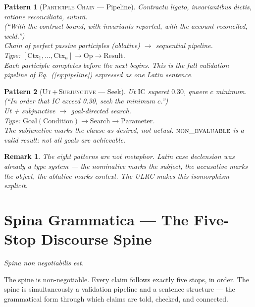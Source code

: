\documentclass[
  aps,
  prd,
  twocolumn,
  superscriptaddress,
  nofootinbib,
  floatfix
]{revtex4-2}
\newtheorem{remark}{Remark}
\newtheorem{pattern}{Pattern}
\newcommand{\regime}[1]{\textrm{\upshape\scshape#1}}
\newcommand{\IC}{\mathrm{IC}}
\newcommand{\lat}[1]{\textit{#1}}
\begin{document}
\begin{pattern}[\textsc{Participle Chain} ---
  Pipeline]\label{pat:participle}
\lat{Contractu ligato, invariantibus dictis,
  ratione reconciliat\=a, sutur\=a.}\\
(``With the contract bound, with invariants reported, with the
account reconciled, weld.'')\\
Chain of perfect passive participles (ablative) $\to$ sequential
pipeline.\\
Type: $[\mathrm{Ctx}_1, \ldots, \mathrm{Ctx}_n]
  \to \mathrm{Op} \to \mathrm{Result}$.\\
Each participle completes before the next begins. This
\emph{is} the full validation pipeline of Eq.~(\ref{eq:pipeline})
expressed as one Latin sentence.
\end{pattern}

\begin{pattern}[\textsc{Ut\,+\,Subjunctive} ---
  Seek]\label{pat:ut-subj}
\lat{Ut $\IC$ superet $0.30$, quaere $c$ minimum.}
(``In order that IC exceed 0.30, seek the minimum $c$.'')\\
\lat{Ut} + subjunctive $\to$ goal-directed search.\\
Type: $\mathrm{Goal}(\mathrm{Condition}) \to \mathrm{Search}
  \to \mathrm{Parameter}$.\\
The subjunctive marks the clause as desired, not actual.
$\regime{non\_evaluable}$ is a valid result: not all goals are
achievable.
\end{pattern}

\begin{remark}
The eight patterns are not metaphor. Latin case declension
\emph{was already} a type system --- the nominative marks the
subject, the accusative marks the object, the ablative marks
context. The ULRC makes this isomorphism explicit.
\end{remark}

\section{Spina Grammatica ---
  The Five-Stop Discourse Spine}\label{sec:spina}

\lat{Spina non negotiabilis est.}

\smallskip\noindent
The spine is non-negotiable. Every claim follows exactly five
stops, in order. The spine is simultaneously a validation pipeline
and a sentence structure --- the grammatical form through which
claims are told, checked, and connected.
\end{document}
